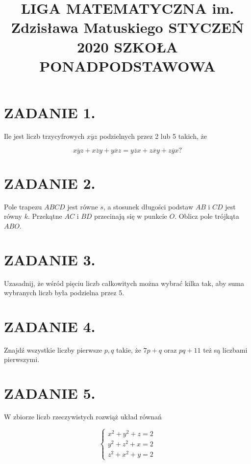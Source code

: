 \documentclass[10pt]{article}
\title{LIGA MATEMATYCZNA im. Zdzisława Matuskiego STYCZEŃ 2020 SZKOŁA PONADPODSTAWOWA }
\author{}
\date{}
\begin{document}
\maketitle
\section*{ZADANIE 1.}
Ile jest liczb trzycyfrowych \(\overline{x y z}\) podzielnych przez 2 lub 5 takich, że

\[
\overline{x y z}+\overline{x z y}+\overline{y x z}=\overline{y z x}+\overline{z x y}+\overline{z y x} ?
\]

\section*{ZADANIE 2.}
Pole trapezu \(A B C D\) jest równe \(s\), a stosunek długości podstaw \(A B\) i \(C D\) jest równy \(k\). Przekątne \(A C\) i \(B D\) przecinają się w punkcie \(O\). Oblicz pole trójkąta \(A B O\).

\section*{ZADANIE 3.}
Uzasadnij, że wśród pięciu liczb całkowitych można wybrać kilka tak, aby suma wybranych liczb była podzielna przez 5.

\section*{ZADANIE 4.}
Znajdź wszystkie liczby pierwsze \(p, q\) takie, że \(7 p+q\) oraz \(p q+11\) też są liczbami pierwszymi.

\section*{ZADANIE 5.}
W zbiorze liczb rzeczywistych rozwiąż układ równań

\[
\left\{\begin{array}{l}
x^{2}+y^{2}+z=2 \\
y^{2}+z^{2}+x=2 \\
z^{2}+x^{2}+y=2
\end{array}\right.
\]
\end{document}
